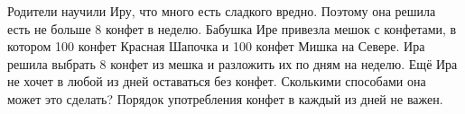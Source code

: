 
Родители научили Иру, что много есть сладкого вредно. Поэтому она решила есть не больше 8 конфет в неделю. Бабушка Ире привезла мешок с конфетами, в котором 100 конфет Красная Шапочка и 100 конфет Мишка на Севере. Ира решила выбрать 8 конфет из мешка и разложить их по дням на неделю. Ещё Ира не хочет в любой из дней оставаться без конфет. Сколькими способами она может это сделать? Порядок употребления конфет в каждый из дней не важен.

\soultionSection

